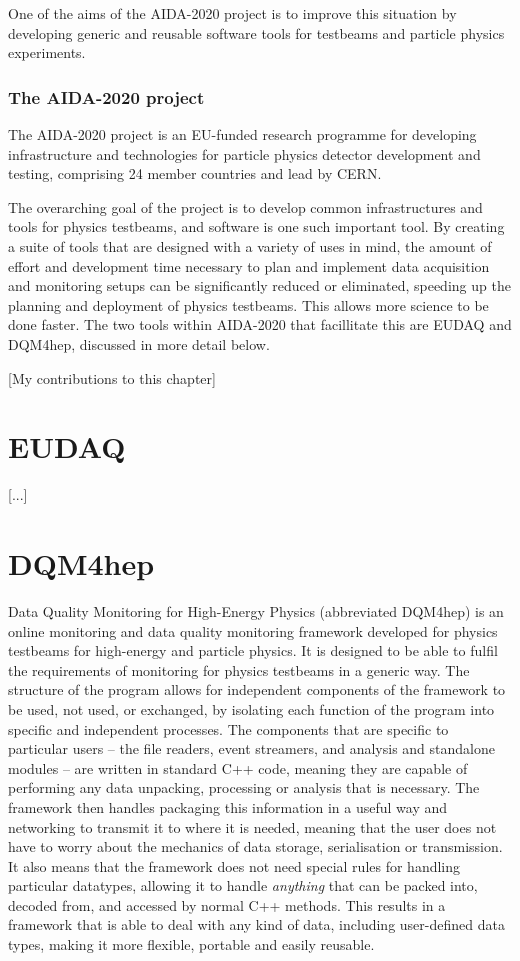 One of the aims of the AIDA-2020 project is to improve this situation by developing generic and reusable software tools for testbeams and particle physics experiments.

\subsubsection{The AIDA-2020 project}
The AIDA-2020 project is an EU-funded research programme for developing infrastructure and technologies for particle physics detector development and testing, comprising 24 member countries and lead by CERN.

The overarching goal of the project is to develop common infrastructures and tools for physics testbeams, and software is one such important tool. By creating a suite of tools that are designed with a variety of uses in mind, the amount of effort and development time necessary to plan and implement data acquisition and monitoring setups can be significantly reduced or eliminated, speeding up the planning and deployment of physics testbeams. This allows more science to be done faster. The two tools within AIDA-2020 that facillitate this are EUDAQ and DQM4hep, discussed in more detail below.

[My contributions to this chapter]

\section{EUDAQ}
[...]

\section{DQM4hep}
Data Quality Monitoring for High-Energy Physics (abbreviated DQM4hep) is an online monitoring and data quality monitoring framework developed for physics testbeams for high-energy and particle physics. It is designed to be able to fulfil the requirements of monitoring for physics testbeams in a generic way. The structure of the program allows for independent components of the framework to be used, not used, or exchanged, by isolating each function of the program into specific and independent processes. The components that are specific to particular users -- the file readers, event streamers, and analysis and standalone modules -- are written in standard C++ code, meaning they are capable of performing any data unpacking, processing or analysis that is necessary. The framework then handles packaging this information in a useful way and networking to transmit it to where it is needed, meaning that the user does not have to worry about the mechanics of data storage, serialisation or transmission. It also means that the framework does not need special rules for handling particular datatypes, allowing it to handle \emph{anything} that can be packed into, decoded from, and accessed by normal C++ methods. This results in a framework that is able to deal with any kind of data, including user-defined data types, making it more flexible, portable and easily reusable.

